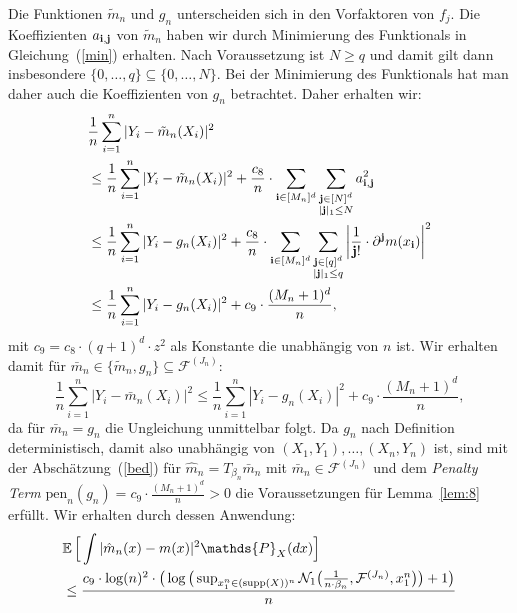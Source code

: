 {Die Funktionen $\tilde{m}_n$ und $g_n$ unterscheiden sich in den Vorfaktoren von $f_j$. Die Koeffizienten $a_{\mathbf{i},\mathbf{j}}$ von $\tilde{m}_n$ haben wir durch Minimierung des Funktionals in Gleichung~(\ref{min}) erhalten. Nach Voraussetzung ist $N \geq q$ und damit gilt dann insbesondere $\{0,\dots,q\} \subseteq \{0,\dots,N\}$. Bei der Minimierung des Funktionals hat man daher auch die Koeffizienten von $g_n$ betrachtet. Daher erhalten wir:
\begin{equation}
\begin{split}
\label{tilde}
& \frac{1}{n} \sum_{i = 1}^n|Y_i - \tilde{m}_n(X_i)|^2 \\
& \leq \frac{1}{n} \sum_{i = 1}^n|Y_i - \tilde{m}_n(X_i)|^2 + \frac{c_8}{n} \cdot \sum_{\mathbf{i} \in [M_n]^d} \sum_{\substack{ \mathbf{j} \in [N]^d \\ |\mathbf{j}|_1 \leq N}} a_{\mathbf{i},\mathbf{j}}^2 \\
& \leq \frac{1}{n} \sum_{i = 1}^n|Y_i - g_n(X_i)|^2 + \frac{c_8}{n} \cdot \sum_{\mathbf{i} \in [M_n]^d} \sum_{\substack{ \mathbf{j} \in [q]^d \\ |\mathbf{j}|_1 \leq q}} \bigg|\frac{1}{\mathbf{j}!} \cdot \partial^{\mathbf{j}}m(x_{\mathbf{i}})\bigg|^2 \\
& \leq \frac{1}{n} \sum_{i = 1}^n|Y_i - g_n(X_i)|^2 + c_{9} \cdot \frac{(M_n + 1)^d}{n},
\end{split}
\end{equation}
mit $c_{9} = c_8 \cdot (q + 1)^d \cdot z^2$ als Konstante die unabhängig von $n$ ist.
Wir erhalten damit für $\bar{m}_n \in \{\tilde{m}_n, g_n\} \subseteq \mathcal{F}^{(J_n)}$:
\begin{equation}
\label{bed}
\frac{1}{n} \sum_{i = 1}^n|Y_i - \bar{m}_n(X_i)|^2 \leq \frac{1}{n} \sum_{i = 1}^n|Y_i - g_n(X_i)|^2 + c_9 \cdot \frac{(M_n + 1)^d}{n},
\end{equation}
da für $\bar{m}_n = g_n$ die Ungleichung unmittelbar folgt.
Da $g_n$ nach Definition deterministisch, damit also unabhängig von $(X_1, Y_1),\dots,(X_n, Y_n)$ ist, sind mit der Abschätzung~(\ref{bed}) für $\hat{m}_n = T_{\beta_n}\bar{m}_n$ mit $\bar{m}_n \in \mathcal{F}^{(J_n)}$ und dem \emph{Penalty Term} $\mathrm{pen}_n(g_{n}) = c_9 \cdot \frac{(M_n + 1)^d}{n} > 0$ die Voraussetzungen für Lemma~\ref{lem:8} erfüllt. Wir erhalten durch dessen Anwendung:
\begin{equation}
\label{eq:lem8}
\begin{split}
& \E \Big[\int |\hat{m}_n(x) - m(x)|^2 \mathds{P}_X(dx)\Big] \\
& \leq \frac{c_9 \cdot \log(n)^2 \cdot \big(\log\big(\sup_{x_1^n \in (\supp(X))^n}\mathcal{N}_1\big(\frac{1}{n \cdot \beta_n},\mathcal{F}^{(J_n)},x_1^n\big)\big) + 1\big)}{n} \\

\end{split}
\end{equation}}
